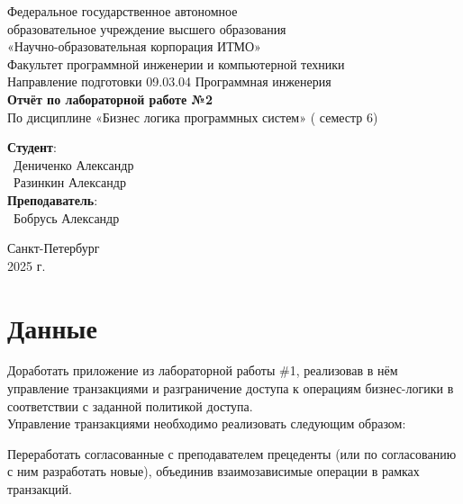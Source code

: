 \documentclass{article}
\begin{document}
\begin{center}
    \Large
    Федеральное государственное автономное \\
    образовательное учреждение высшего образования \\ 
    «Научно-образовательная корпорация ИТМО»\\
    \vspace{0.5cm}
    \large
    Факультет программной инженерии и компьютерной техники \\
    Направление подготовки 09.03.04 Программная инженерия \\
    \vspace{1cm}
    \Large
    \textbf{Отчёт по лабораторной работе №2} \\
        По дисциплине «Бизнес логика программных систем» ( семестр 6)\\
    \large
    \vspace{8cm}

    \begin{minipage}{.33\textwidth}
    \end{minipage}
    \hfill
    \begin{minipage}{.4\textwidth}
    
        \textbf{Студент}: \vspace{.1cm} \\
        \ Дениченко Александр\\
        \ Разинкин Александр\\
        \textbf{Преподаватель}:  \\
        \ Бобрусь Александр
    \end{minipage}
    \vfill
Санкт-Петербург\\ 2025 г.
\end{center}
\pagestyle{empty}
\newpage
\pagestyle{plain}

\section*{Данные}
Доработать приложение из лабораторной работы \#1, реализовав в нём управление транзакциями и разграничение доступа к операциям бизнес-логики в соответствии с заданной политикой доступа.
\\
Управление транзакциями необходимо реализовать следующим образом:

Переработать согласованные с преподавателем прецеденты (или по согласованию с ним разработать новые), объединив взаимозависимые операции в рамках транзакций.
\end{document}

